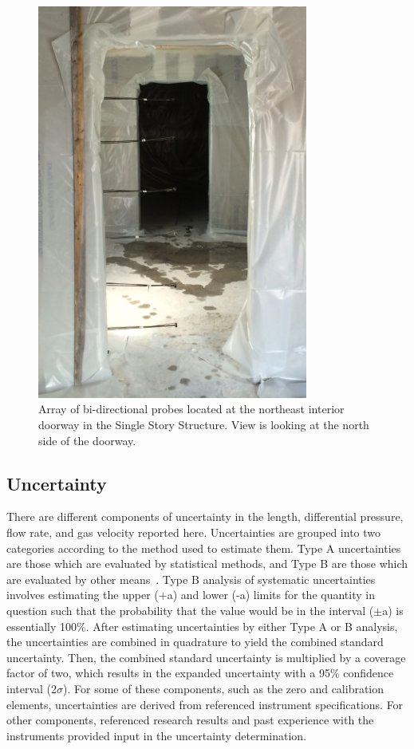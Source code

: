 \documentclass[12pt,oneside]{book}
\begin{document}
\begin{figure}[!ht]
	\includegraphics[width=3.5in]{../Figures/Pictures/BDPs_east}
	\caption[Array of bi-directional probes at interior doorway in Single Story Structure.]{Array of bi-directional probes located at the northeast interior doorway in the Single Story Structure. View is looking at the north side of the doorway.}
	\label{fig:BDPs}
\end{figure}
\FloatBarrier

\subsection{Uncertainty}
\label{sec:uncertainty}
There are different components of uncertainty in the length, differential pressure, flow rate, and gas velocity reported here. Uncertainties are grouped into two categories according to the method used to estimate them. Type A uncertainties are those which are evaluated by statistical methods, and Type B are those which are evaluated by other means~\cite{Taylor&Kuyatt:1994}. Type B analysis of systematic uncertainties involves estimating the upper (+a) and lower (-a) limits for the quantity in question such that the probability that the value would be in the interval ($\pm$a) is essentially 100\%. After estimating uncertainties by either Type A or B analysis, the uncertainties are combined in quadrature to yield the combined standard uncertainty. Then, the combined standard uncertainty is multiplied by a coverage factor of two, which results in the expanded uncertainty with a 95\% confidence interval (2$\sigma$). For some of these components, such as the zero and calibration elements, uncertainties are derived from referenced instrument specifications. For other components, referenced research results and past experience with the instruments provided input in the uncertainty determination. 
\end{document}

